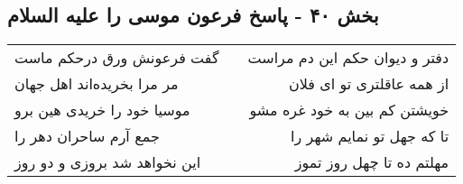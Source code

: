 \begin{center}
\section*{بخش ۴۰ - پاسخ فرعون موسی را علیه السلام}
\label{sec:sh040}
\begin{longtable}{l p{0.5cm} r}
گفت فرعونش ورق درحکم ماست
&&
دفتر و دیوان حکم این دم مراست
\\
مر مرا بخریده‌اند اهل جهان
&&
از همه عاقلتری تو ای فلان
\\
موسیا خود را خریدی هین برو
&&
خویشتن کم بین به خود غره مشو
\\
جمع آرم ساحران دهر را
&&
تا که جهل تو نمایم شهر را
\\
این نخواهد شد بروزی و دو روز
&&
مهلتم ده تا چهل روز تموز
\\
\end{longtable}
\end{center}

